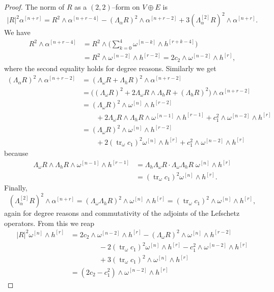 \documentclass[11pt,a4paper]{amsart}
\def\ap#1{\alpha^{[#1]}}
\def\wp#1{\omega^{[#1]}}
\def\hp#1{h^{[#1]}}
\def\Lp#1{\Lambda^{[#1]}}
\DeclareMathOperator{\tr}{tr}
\theoremstyle{definition}
\numberwithin{equation}{section}
\begin{document}
\begin{proof}
The norm of $R$ as a $(2,2)$--form on $V \oplus E$ is
$$
|R|^2 \ap{n+r}
= R^2 \wedge \ap{n+r-4}
- (\Lambda_\alpha R)^2 \wedge \ap{n+r-2}
+ 3 (\Lp{2}_\alpha R)^2 \wedge \ap{n+r}.
$$
We have
\begin{align*}
R^2 \wedge \ap{n+r-4}
&= R^2 \wedge \biggl(\sum_{k=0}^4\wp{n-k} \wedge \hp{r+k-4}\biggr)
\\
&= R^2 \wedge \wp{n-2} \wedge \hp{r-2}
= 2 c_2 \wedge \wp{n-2} \wedge \hp{r},
\end{align*}
where the second equality holds for degree reasons. Similarly we get
\begin{align*}
(\Lambda_\alpha R)^2 \wedge \ap{n+r-2}
&= (\Lambda_\omega R + \Lambda_h R)^2 \wedge \ap{n+r-2}
\\
&= \bigl( (\Lambda_\omega R)^2 + 2 \Lambda_\omega R \wedge \Lambda_h R 
+ (\Lambda_h R)^2 \bigr) 
\wedge \ap{n+r-2}
\\
&= (\Lambda_\omega R)^2 \wedge \wp{n} \wedge \hp{r-2} 
\\
&\qquad
+ 2 \Lambda_\omega R \wedge \Lambda_h R \wedge \wp{n-1} \wedge \hp{r-1}
+ c_1^2 \wedge \wp{n-2} \wedge \hp{r} 
\\
&= (\Lambda_\omega R)^2 \wedge \wp{n} \wedge \hp{r-2} 
\\
&\qquad
+ 2 (\tr_\omega c_1)^2 \wp{n} \wedge \hp{r}
+ c_1^2 \wedge \wp{n-2} \wedge \hp{r} 
\end{align*}
because 
\begin{align*}
\Lambda_\omega R \wedge \Lambda_h R \wedge \wp{n-1} \wedge \hp{r-1}
&= \Lambda_h \Lambda_\omega R \cdot \Lambda_\omega \Lambda_h R \;
\wp{n} \wedge \hp{r}
\\
&= (\tr_\omega c_1)^2 \wp{n} \wedge \hp{r}.
\end{align*}
Finally, 
$$
(\Lp{2}_\alpha R)^2 \wedge \ap{n+r} 
= (\Lambda_\omega \Lambda_h R)^2 \wedge \wp{n} \wedge \hp{r}
= (\tr_\omega c_1)^2 \wedge \wp{n} \wedge \hp{r},
$$
again for degree reasons and commutativity of the adjoints of the Lefschetz
operators. From this we reap
\begin{align*}
    \lvert R \rvert^2 \wp{n} \wedge \hp{r}
    &= 2 c_2 \wedge \wp{n-2} \wedge \hp{r}
    - (\Lambda_\omega R)^2 \wedge \wp{n} \wedge \hp{r-2} 
    \\
    &\qquad\qquad
    {}- 2 (\tr_\omega c_1)^2 \wp{n} \wedge \hp{r}
    - c_1^2 \wedge \wp{n-2} \wedge \hp{r} 
    \\
    &\qquad\qquad
    {}+ 3 (\tr_\omega c_1)^2 \wedge \wp{n} \wedge \hp{r}
    \\
    &= (2 c_2 - c_1^2) \wedge \wp{n-2} \wedge \hp{r} 

\end{align*}
\end{proof}
\end{document}
